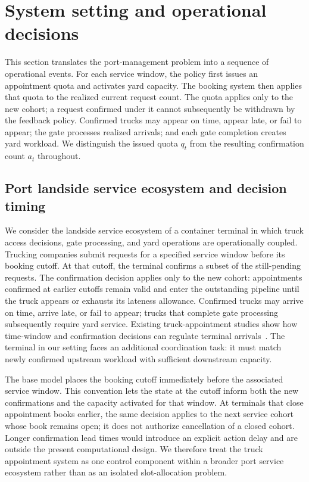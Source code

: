 \documentclass[preprint,12pt,authoryear,a4paper]{elsarticle}
\begin{document}
\section{System setting and operational decisions}
\label{sec:system-setting}

This section translates the port-management problem into a sequence of operational events. For each service window, the policy first issues an appointment quota and activates yard capacity. The booking system then applies that quota to the realized current request count. The quota applies only to the new cohort; a request confirmed under it cannot subsequently be withdrawn by the feedback policy. Confirmed trucks may appear on time, appear late, or fail to appear; the gate processes realized arrivals; and each gate completion creates yard workload. We distinguish the issued quota \(q_t\) from the resulting confirmation count \(a_t\) throughout.

\subsection{Port landside service ecosystem and decision timing}
\label{subsec:3-1-port-landside-service-ecosystem-and-decision-timing}

We consider the landside service ecosystem of a container terminal in which truck access decisions, gate processing, and yard operations are operationally coupled. Trucking companies submit requests for a specified service window before its booking cutoff. At that cutoff, the terminal confirms a subset of the still-pending requests. The confirmation decision applies only to the new cohort: appointments confirmed at earlier cutoffs remain valid and enter the outstanding pipeline until the truck appears or exhausts its lateness allowance. Confirmed trucks may arrive on time, arrive late, or fail to appear; trucks that complete gate processing subsequently require yard service. Existing truck-appointment studies show how time-window and confirmation decisions can regulate terminal arrivals~\citep{GuanLiu2009GateAppointment,TorkjaziHuynhShiri2018TruckTours,LiJiaTaoLin2024RobustGateAppointment}. The terminal in our setting faces an additional coordination task: it must match newly confirmed upstream workload with sufficient downstream capacity.

The base model places the booking cutoff immediately before the associated service window. This convention lets the state at the cutoff inform both the new confirmations and the capacity activated for that window. At terminals that close appointment books earlier, the same decision applies to the next service cohort whose book remains open; it does not authorize cancellation of a closed cohort. Longer confirmation lead times would introduce an explicit action delay and are outside the present computational design. We therefore treat the truck appointment system as one control component within a broader port service ecosystem rather than as an isolated slot-allocation problem.
\end{document}
